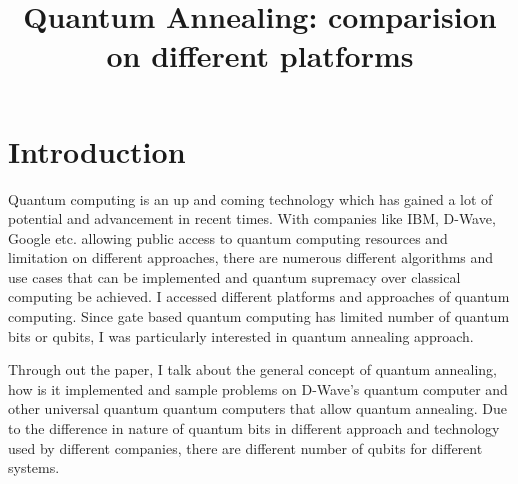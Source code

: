\documentclass[conference]{IEEEtran}
\begin{document}
\title{Quantum Annealing: comparision on different platforms}

\author{
}

\maketitle



\section{Introduction}

Quantum computing is an up and coming technology which has gained a lot of potential and advancement in recent times. With companies like IBM, D-Wave, Google etc. allowing public access to quantum computing resources and limitation on different approaches, there are numerous different algorithms and use cases that can be implemented and quantum supremacy over classical computing be achieved. I accessed different platforms and approaches of quantum computing. Since gate based quantum computing has limited number of quantum bits or qubits, I was particularly interested in quantum annealing approach. 

Through out the paper, I talk about the general concept of quantum annealing, how is it implemented and sample problems on D-Wave's quantum computer and other universal quantum quantum computers that allow quantum annealing. Due to the difference in nature of quantum bits in different approach and technology used by different companies, there are different number of qubits for different systems. 
\end{document}
